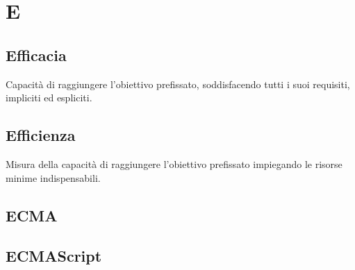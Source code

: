\section*{E}

\subsection{Efficacia}
Capacità di raggiungere l'obiettivo prefissato, soddisfacendo tutti i suoi requisiti, impliciti ed espliciti.

\subsection{Efficienza}
Misura della capacità di raggiungere l'obiettivo prefissato impiegando le risorse minime indispensabili.

\subsection{ECMA}

\subsection{ECMAScript}